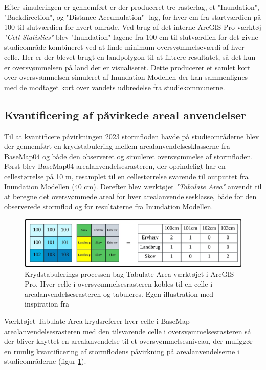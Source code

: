 Efter simuleringen er gennemført er der produceret tre rasterlag, et "Inundation", "Backdirection", og "Distance Accumulation" -lag, for hver cm fra startværdien på 100 til slutværdien for hvert område. Ved brug af det interne ArcGIS Pro værktøj \textit{"Cell Statistics"} blev "Inundation" \hspace{0.2cm} lagene fra 100 cm til slutværdien for det givne studieområde kombineret ved at finde minimum oversvømmelseværdi af hver celle. Her er der blevet brugt en landpolygon til at filtrere resultatet, så det kun er oversvømmelsen på land der er visualiseret. Dette producerer et samlet kort over oversvømmelsen simuleret af Inundation Modellen der kan sammenlignes med de modtaget kort over vandets udbredelse fra studiekommunerne. 

\subsection{Kvantificering af påvirkede areal anvendelser} \label{Afsnit: Udregning af påvirkede areal anvendelser}

Til at kvantificere påvirkningen 2023 stormfloden havde på studieområderne blev der gennemført en krydstabulering mellem arealanvendelsesklasserne fra BaseMap04 og både den observeret og simuleret oversvømmelse af stormfloden. \\

Først blev BaseMap04-arealanvendelsesrasteren, der oprindeligt har en cellestørrelse på 10 m, resamplet til en cellestørrelse svarende til outputtet fra Inundation Modellen (40 cm). Derefter blev værktøjet \textit{"Tabulate Area"} anvendt til at beregne det oversvømmede areal for hver arealanvendelsesklasse, både for den observerede stormflod og for resultaterne fra Inundation Modellen. 
\begin{figure}[H]
    \centering
    \includegraphics[width=1\linewidth]{images/metode/tabulate.jpg}
    \caption{Krydstabulerings processen bag Tabulate Area værktøjet i ArcGIS Pro. Hver celle i oversvømmelsesrasteren kobles til en celle i arealanvendelsesrasteren og tabuleres. Egen illustration med inspiration fra \cite{esri_tabulate_nodate}}
    \label{Figur: Tabulate}
\end{figure}
Værktøjet Tabulate Area krydsreferer hver celle i BaseMap-arealanvendelsesrasteren med den tilsvarende celle i oversvømmelsesrasteren så der bliver knyttet en arealanvendelse til et oversvømmelsesniveau, der muliggør en rumlig kvantificering af stormflodens påvirkning på arealanvendelserne i studieområderne (figur \ref{Figur: Tabulate}).\\

